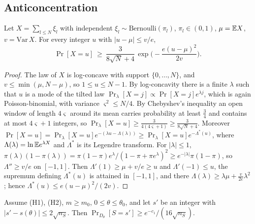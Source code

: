 \subsection{Anticoncentration}

\begin{lemma}\label{lem:pb-local}
Let $X=\sum_{l\le N}\xi_l$ with independent $\xi_l\sim\mathrm{Bernoulli}(\pi_l)$,
$\pi_l\in(0,1)$, $\mu=\mathbb{E} X$, $v=\mathrm{Var}\,X$. For every integer $u$ with $|u-\mu|\le v/e$,
\[
\Pr[X=u]\ \ge\ \frac3{8\sqrt N+4}\,\exp\Big(-\frac{e(u-\mu)^2}{2v}\Big).
\]
\end{lemma}

\begin{proof}
The law of $X$ is log-concave with support $\{0,\dots,N\}$, and $v\le\min(\mu,N-\mu)$, so
$1\le u\le N-1$. By log-concavity there is a finite $\lambda$ such that $u$ is a mode of the
tilted law $\Pr_\lambda[X=j]\propto\Pr[X=j]e^{\lambda j}$, which is again Poisson-binomial, with
variance $\varsigma^2\le N/4$. By Chebyshev's inequality an open window of length $4\varsigma$ around
its mean carries probability at least $\frac34$ and contains at most $4\varsigma+1$ integers, so
$\Pr_\lambda[X=u]\ge\frac3{4(4\varsigma+1)}\ge\frac3{8\sqrt N+4}$. Moreover
$\Pr[X=u]=\Pr_\lambda[X=u]e^{-(\lambda u-\Lambda(\lambda))}\ge\Pr_\lambda[X=u]e^{-\Lambda^*(u)}$, where
$\Lambda(\lambda)=\ln\mathbb{E} e^{\lambda X}$ and $\Lambda^*$ is its Legendre transform. For $|\lambda|\le1$,
$\pi(\lambda)(1-\pi(\lambda))=\pi(1-\pi)e^\lambda/(1-\pi+\pi e^\lambda)^2\ge e^{-|\lambda|}\pi(1-\pi)$, so
$\Lambda''\ge v/e$ on $[-1,1]$. Then $\Lambda'(1)\ge\mu+v/e\ge u$ and $\Lambda'(-1)\le u$, the
supremum defining $\Lambda^*(u)$ is attained in $[-1,1]$, and there
$\Lambda(\lambda)\ge\lambda\mu+\frac v{2e}\lambda^2$; hence $\Lambda^*(u)\le e(u-\mu)^2/(2v)$.
\end{proof}

\begin{lemma}[anticoncentration]\label{lem:local-anti}
Assume (H1), (H2), $m\ge m_0$, $0\le\theta\le\theta_0$, and let $s'$ be an integer with
$|s'-s(\theta)|\le2\sqrt{n_S}$. Then $\Pr_{D_\theta}[S=s']\ge e^{-c_1}/(16\sqrt{n_S})$.
\end{lemma}

